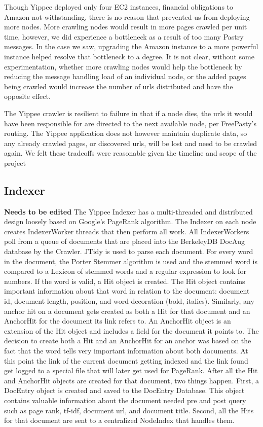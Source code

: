 \documentclass[11pt, letterpaper, oneside, twocolumn]{article}
\begin{document}
Though Yippee deployed only four EC2 instances, financial obligations to Amazon not-withstanding, there is no reason that prevented us from deploying more nodes.
More crawling nodes would result in more pages crawled per unit time, however, we did experience a bottleneck as a result of too many Pastry messages.
In the case we saw, upgrading the Amazon instance to a more powerful instance helped resolve that bottleneck to a degree.
It is not clear, without some experimentation, whether more crawling nodes would help the bottleneck by reducing the message handling load of an individual node, or the added pages being crawled would increase the number of urls distributed and have the opposite effect.

The Yippee crawler is resilient to failure in that if a node dies, the urls it would have been responsible for are directed to the next available node, per FreePasty's routing.
The Yippee application does not however maintain duplicate data, so any already crawled pages, or discovered urls, will be lost and need to be crawled again.
We felt these tradeoffs were reasonable given the timeline and scope of the project

\subsection{Indexer}

\textbf{Needs to be edited}
The Yippee Indexer has a multi-threaded and distributed design loosely based on Google's  PageRank algorithm\cite{pagerank}. 
The Indexer on each node creates IndexerWorker threads that then perform all work. 
All IndexerWorkers poll from a queue of documents that are placed into the BerkeleyDB DocAug database by the Crawler. 
JTidy is used to parse each document. 
For every word in the document, the Porter Stemmer algorithm is used and the stemmed word is compared to a Lexicon of stemmed words and a regular expression to look for numbers. 
If the word is valid, a Hit object is created. 
The Hit object contains important information about that word in relation to the document: document id, document length, position, and word decoration (bold, italics). 
Similarly, any anchor hit on a document gets created as both a Hit for that document and an AnchorHit for the document its link refers to. 
An AnchorHit object is an extension of the Hit object and includes a field for the document it points to. 
The decision to create both a Hit and an AnchorHit for an anchor was based on the fact that the word tells very important information about both documents. 
At this point the link of the current document getting indexed and the link found get logged to a special file that will later get used for PageRank. 
After all the Hit and AnchorHit objects are created for that document, two things happen. 
First, a DocEntry object is created and saved to the DocEntry Database. 
This object contains valuable information about the document needed pre and post query such as page rank, tf-idf, document url, and document title. 
Second, all the Hits for that document are sent to a centralized NodeIndex that handles them.
\end{document}
